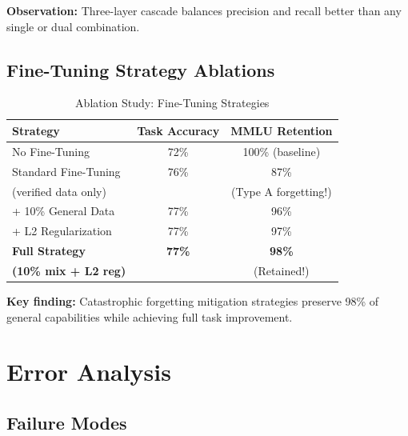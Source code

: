 \documentclass[12pt,a4paper]{article}
\theoremstyle{definition}
\begin{document}
\textbf{Observation:} Three-layer cascade balances precision and recall better than any single or dual combination.

\subsection{Fine-Tuning Strategy Ablations}

\begin{table}[htbp]
\centering
\caption{Ablation Study: Fine-Tuning Strategies}
\begin{tabular}{lcc}
\toprule
\textbf{Strategy} & \textbf{Task Accuracy} & \textbf{MMLU Retention} \\
\midrule
No Fine-Tuning & 72\% & 100\% (baseline) \\
\midrule
Standard Fine-Tuning & 76\% & 87\% \\
\quad (verified data only) & & (Type A forgetting!) \\
\midrule
+ 10\% General Data & 77\% & 96\% \\
\midrule
+ L2 Regularization & 77\% & 97\% \\
\midrule
\textbf{Full Strategy} & \textbf{77\%} & \textbf{98\%} \\
\textbf{(10\% mix + L2 reg)} & & (Retained!) \\
\bottomrule
\end{tabular}
\end{table}

\textbf{Key finding:} Catastrophic forgetting mitigation strategies preserve 98\% of general capabilities while achieving full task improvement.

\newpage

\section{Error Analysis}

\subsection{Failure Modes}
\end{document}
